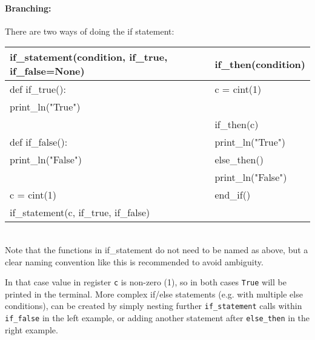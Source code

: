 \paragraph{Branching:}
There are two ways of doing the if statement:
\begin{center}
  \begin{tabular}{|l|l|} \hline
    \textbf{if_statement(condition, if_true, if_false=None)} & \textbf{if_then(condition)} \\ \hline
    def if_true():                                           & c = cint(1)                 \\
    \hspace{5 mm}print_ln("True")                            &                             \\
                                                             & if_then(c)                  \\
    def if_false():                                          & print_ln("True")            \\
    \hspace{5 mm}print_ln("False")                           & else_then()                 \\
                                                             & print_ln("False")           \\
    c = cint(1)                                              & end_if()                    \\
    if_statement(c, if_true, if_false)                       &                             \\ \hline
  \end{tabular}
  \begin{footnotesize}
    \\ Note that the functions in if_statement do not need to be named as above, but a clear naming convention like this is recommended to avoid ambiguity.
  \end{footnotesize}
\end{center}
In that case value in register \verb|c| is non-zero (1), so in both cases \verb|True| will be printed in the terminal. More complex if/else statements (e.g. with multiple else conditions), can be created by simply nesting further \verb|if_statement| calls within \verb|if_false| in the left example, or adding another statement after \verb|else_then| in the right example. \\


